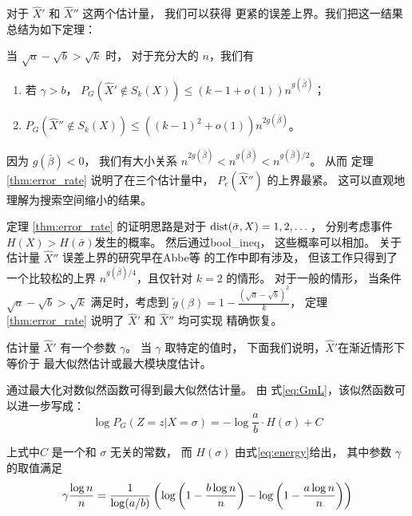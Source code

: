 对于 $\hat{X}'$ 和 $\hat{X}''$ 这两个估计量，
我们可以获得 更紧的误差上界。我们把这一结果总结为如下定理：
\begin{theorem}\label{thm:error_rate}
当 $\sqrt{a} - \sqrt{b} > \sqrt{k}$ 时，
对于充分大的 $n$，我们有 
\begin{enumerate}
	\item 若 $\gamma > b$， $P_G(\hat{X}' \not\in S_k(X)) \leq (k-1+o(1))n^{g(\bar{\beta})}$；
	\item $P_G(\hat{X}'' \not\in S_k(X)) \leq \left((k-1)^2+o(1) \right)n^{2g(\bar{\beta})}$。
\end{enumerate}
\end{theorem}
因为 $g(\bar{\beta})<0$， 我们有大小关系 $n^{2g(\bar{\beta})} < n^{g(\bar{\beta})} < n^{g(\bar{\beta})/2}$。
从而 定理 \ref{thm:error_rate} 说明了在三个估计量中，
$P_e(\hat{X}'')$ 
的上界最紧。
这可以直观地理解为搜索空间缩小的结果。

定理 \ref{thm:error_rate} 的证明思路是对于 $\operatorname{dist}(\bar{\sigma}, X) = 1, 2,\dots$，
分别考虑事件
$H(X) > H(\bar{\sigma})$发生的概率。
然后通过\gls{bool_ineq}， 这些概率可以相加。
关于估计量 $\hat{X}''$ 误差上界的研究早在Abbe等\cite{abbe2015exact} 的工作中即有涉及，
但该工作只得到了一个比较松的上界 $n^{g(\bar{\beta})/4}$，且仅针对 $k=2$ 的情形。
对于一般的情形，
当条件
$\sqrt{a} - \sqrt{b} > \sqrt{k}$ 满足时，考虑到
$\tilde{g}(\beta) = 1- \frac{\left(\sqrt{a} - \sqrt{b}\right)^2}{k}$，
定理 \ref{thm:error_rate} 说明了  $\hat{X}'$ 和 $\hat{X}''$
均可实现
精确恢复。


估计量 $\hat{X}'$ 有一个参数 $\gamma$。
当 $\gamma$ 取特定的值时， 下面我们说明，$\hat{X}'$在渐近情形下
等价于 最大似然估计或最大模块度估计。

通过最大化对数似然函数可得到最大似然估计量。
由 式\eqref{eq:GmL}，该似然函数可以进一步写成：
\begin{equation}\label{eq:PG_energy}
	\log P_G(Z=z|X=\sigma) = -\log\frac{a}{b} \cdot H(\sigma) + C
\end{equation}

上式中$C$ 是一个和 $\sigma$ 无关的常数，
而 $H(\sigma)$ 由式\eqref{eq:energy}给出，
其中参数 $\gamma$ 的取值满足
\begin{equation}\label{eq:special_gamma_ML}
	\gamma \frac{\log n}{n} = \frac{1}{\log(a/b)}
	\left(\log \left(1-\frac{b \log n}{n} \right) - \log \left(1-\frac{a \log n}{n} \right) \right)	 
\end{equation}

